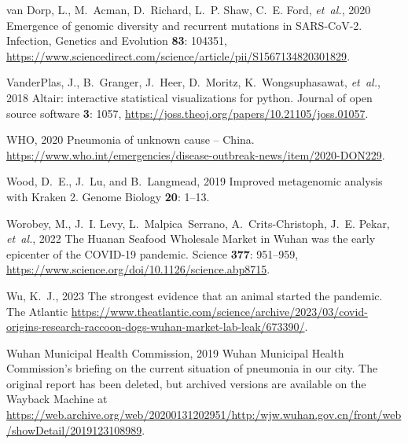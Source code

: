 \documentclass[9pt,twocolumn,twoside]{gsajnl_modified}
\begin{document}
{\begin{thebibliography}{44}
{van Dorp, L., M.~Acman, D.~Richard, L.~P. Shaw, C.~E. Ford, {\em et~al.\/}},
  2020 Emergence of genomic diversity and recurrent mutations in {SARS-CoV-2}.
  Infection, Genetics and Evolution {\bf 83}: 104351,
  \url{https://www.sciencedirect.com/science/article/pii/S1567134820301829}.

{VanderPlas, J., B.~Granger, J.~Heer, D.~Moritz, K.~Wongsuphasawat, {\em
  et~al.\/}}, 2018 Altair: interactive statistical visualizations for python.
  Journal of open source software {\bf 3}: 1057,
  \url{https://joss.theoj.org/papers/10.21105/joss.01057}.

{{WHO}}, 2020 {Pneumonia of unknown cause -- China}.
  \url{https://www.who.int/emergencies/disease-outbreak-news/item/2020-DON229}.

{Wood, D.~E., J.~Lu, {\rm and} B.~Langmead}, 2019 Improved metagenomic analysis
  with {K}raken 2. Genome Biology {\bf 20}: 1--13.

{Worobey, M., J.~I. Levy, L.~Malpica~Serrano, A.~Crits-Christoph, J.~E. Pekar,
  {\em et~al.\/}}, 2022 {The Huanan Seafood Wholesale Market in Wuhan was the
  early epicenter of the COVID-19 pandemic}. Science {\bf 377}: 951--959,
  \url{https://www.science.org/doi/10.1126/science.abp8715}.

{Wu, K.~J.}, 2023 The strongest evidence that an animal started the pandemic.
  The Atlantic
  \url{https://www.theatlantic.com/science/archive/2023/03/covid-origins-research-raccoon-dogs-wuhan-market-lab-leak/673390/}.

{{Wuhan Municipal Health Commission}}, 2019 {Wuhan Municipal Health
  Commission's briefing on the current situation of pneumonia in our city}. The
  original report has been deleted, but archived versions are available on the
  Wayback Machine at
  \url{https://web.archive.org/web/20200131202951/http:/wjw.wuhan.gov.cn/front/web/showDetail/2019123108989}.


\end{thebibliography}}
\end{document}
